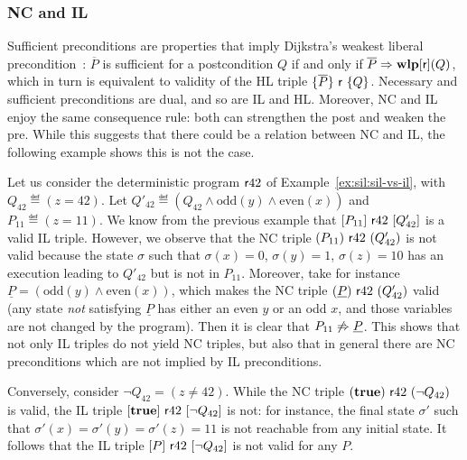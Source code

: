 \subsubsection{NC and IL}
Sufficient preconditions are properties that imply Dijkstra's weakest liberal precondition~\cite{Dijkstra75}: $\overline{P}$ is sufficient for a postcondition $Q$ if and only if $\overline{P} \Rightarrow \textbf{wlp}[\mathsf{r}](Q)$, which in turn is equivalent to validity of the HL triple $\{\overline{P}\}~\mathsf{r}~\{Q\}$. Necessary and sufficient preconditions are dual, and so are IL and HL. Moreover, NC and IL enjoy the same consequence rule: both can strengthen the post and weaken the pre. While this suggests that there could be a relation between NC and IL, the following example shows this is not the case.

\begin{example}
	Let us consider the deterministic program $\mathsf{r} 42$ of Example~\ref{ex:sil:sil-vs-il}, with $Q_{42} \eqdef (z=42)$.
	Let $Q'_{42} \eqdef (Q_{42} \wedge \text{odd}(y) \wedge \text{even}(x))$ and $P_{11} \eqdef (z = 11)$. We know from the previous example that $[P_{11}]~\mathsf{r} 42~[Q'_{42}]$ is a valid IL triple.
	However, we observe that the NC triple $(P_{11})~\mathsf{r} 42~(Q'_{42})$ is not valid because the state $\sigma$ such that $\sigma(x) = 0$, $\sigma(y) = 1$, $\sigma(z) = 10$ has an execution leading to $Q'_{42}$ but is not in $P_{11}$.
	Moreover, take for instance $\underline{P} = (\text{odd}(y) \land \text{even}(x))$, which makes the NC triple $(\underline{P})~\mathsf{r} 42~(Q'_{42})$ valid (any state \emph{not} satisfying $\underline{P}$ has either an even $y$ or an odd $x$, and those variables are not changed by the program). Then it is clear that $P_{11} \notimplies \underline{P}$. This shows that not only IL triples do not yield NC triples, but also that in general there are NC preconditions which are not implied by IL preconditions.

	Conversely, consider $\neg Q_{42} = (z \neq 42)$. While the NC triple $(\textbf{true})~\mathsf{r} 42~(\neg Q_{42})$ is valid, the IL triple $[\textbf{true}]~\mathsf{r} 42~[\neg Q_{42}]$ is not: for instance, the final state $\sigma'$ such that $\sigma'(x) = \sigma'(y) = \sigma'(z) = 11$ is not reachable from any initial state. It follows that the IL triple $[P]~\mathsf{r} 42~[\neg Q_{42}]$ is not valid for any $P$.
\end{example}

